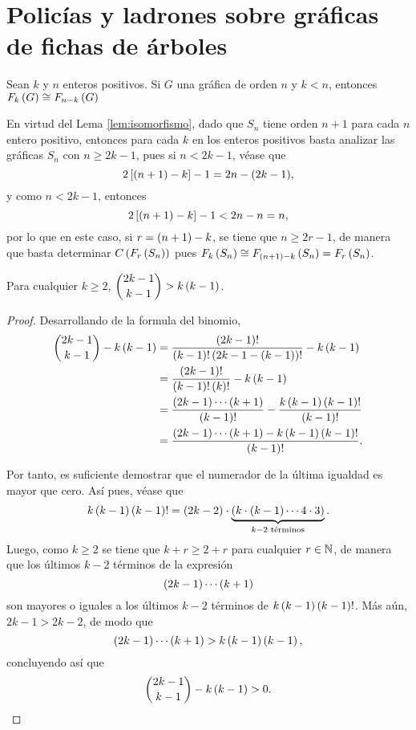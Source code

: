 \chapter{Polic\'ias y ladrones sobre gr\'aficas de fichas de \'arboles}
\label{cap:resultados}

\begin{lema}
\label{lem:isomorfismo}
    Sean $k$ y $n$ enteros positivos. Si $G$ una gr\'afica de orden $n$ y $k < n$,
    entonces $F_{k}\left( G\right) \cong F_{n-k}\left( G\right)$
\end{lema}

En virtud del Lema \ref{lem:isomorfismo}, dado que $S_n$ tiene orden $n+1$ para cada $n$
entero positivo, entonces para cada $k$ en los enteros positivos basta analizar
las gr\'aficas $S_n$ con $n\geq 2k-1$, pues si $n<2k-1$, v\'ease que
    $$2\left[ \left( n+1\right)-k\right]-1 = 2n - (2k-1),$$ y como $n<2k-1$, entonces
    $$2\left[ \left( n+1\right)-k\right]-1 < 2n - n = n,$$ por lo que en este caso, si
$r=\left( n+1\right)-k$, se tiene que $n\geq 2r-1$, de manera que basta determinar
$C\left( F_{r}\left( S_n\right)\right)$ pues $F_{k}\left( S_n\right)\cong F_{\left( n+1\right)-k}\left( S_n\right) = F_{r}\left( S_n\right)$.


\begin{lema}
\label{lem:desigualdad}
    Para cualquier $k\geq 2$, $\displaystyle\binom{2k-1}{k-1} > k\left( k-1\right)$.
\end{lema}
\begin{proof}
    Desarrollando de la formula del binomio,
    \begin{align*}
        \binom{2k-1}{k-1} - k\left( k-1\right) &= \frac{\left( 2k-1\right)!}{\left( k-1\right)!\left( 2k-1-\left( k-1\right)\right)!} - k\left( k-1\right) \\
        &= \frac{\left( 2k-1\right)!}{\left( k-1\right)!\left( k\right)!} - k\left( k-1\right) \\
        &= \frac{\left( 2k-1\right)\cdots \left( k+1\right)}{\left( k-1\right)!} - \frac{k\left( k-1\right)\left( k-1\right)!}{\left( k-1\right)!} \\
        &= \frac{\left( 2k-1\right)\cdots \left( k+1\right) - k\left( k-1\right)\left( k-1\right)!}{\left( k-1\right)!}.
    \end{align*}

    Por tanto, es suficiente demostrar que el numerador de la \'ultima igualdad es
    mayor que cero. As\'i pues, v\'ease que
        $$k\left( k-1\right)\left( k-1\right)! = \left( 2k-2\right)\cdot \underbrace{\left( k \cdot \left( k-1\right)\cdots
    4 \cdot 3\right)}_{k-2 \text{ t\'erminos}}.$$ Luego, como $k\geq 2$ se tiene que
    $k+r \geq 2+r$ para cualquier $r\in\mathbb{N}$, de manera que los \'ultimos $k-2$
    t\'erminos de la expresi\'on 
        $$\left( 2k-1\right)\cdots \left( k+1\right)$$ son mayores o iguales a los \'ultimos $k-2$
    t\'erminos de $k\left( k-1\right)\left( k-1\right)!$. M\'as a\'un, $2k-1 > 2k-2$, de modo que
        $$\left( 2k-1\right)\cdots \left( k+1\right) > k\left( k-1\right)\left( k-1\right),$$ concluyendo as\'i que
        $$\binom{2k-1}{k-1} - k\left( k-1\right) > 0.$$
\end{proof}

